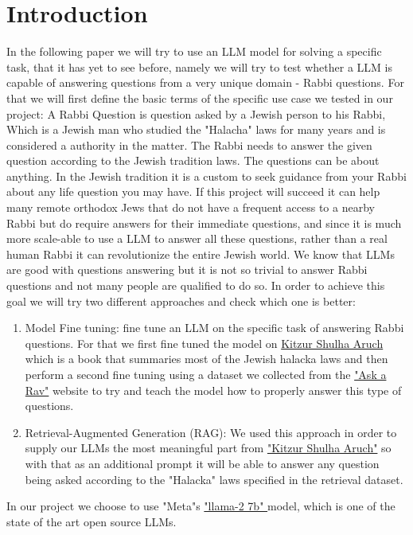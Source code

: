 \documentclass[11pt]{article}
\begin{document}
\section{Introduction}
In the following paper we will try to use an LLM model for solving a specific task, that it has yet to see before, namely we will try to test whether a LLM is capable of answering questions from a very unique domain - Rabbi questions. For that we will first define the basic terms of the specific use case we tested in our project:
A Rabbi Question is question asked by a Jewish person to his Rabbi, Which is a Jewish man who studied the "Halacha" laws for many years and is considered a authority in the matter. The Rabbi needs to answer the given question according to the Jewish tradition laws. The questions can be about anything. In the Jewish tradition it is a custom to seek guidance from your Rabbi about any life question you may have. If this project will succeed it can help many remote orthodox Jews  that do not have a frequent access to a nearby Rabbi but do require answers for their immediate questions, and since it is much more scale-able to use a LLM to answer all these questions, rather than a real human Rabbi it can revolutionize the entire Jewish world.  
We know that LLMs are good with questions answering but it is not so trivial to answer Rabbi questions and not many people are qualified to do so.
In order to achieve this goal we will try two different approaches and check which one is better:
\begin{enumerate}
    \item Model Fine tuning: fine tune an LLM on the specific task of answering Rabbi questions. For that we first fine tuned the model on  \href{https://www.sefaria.org.il/Kitzur_Shulchan_Arukh.1.7?lang=en}{ Kitzur Shulha Aruch} which is a book that summaries most of the Jewish halacka laws and then perform a second fine tuning using a dataset we collected from the \href{https://asktherav.com/ }{"Ask a Rav"} website to try and teach the model how to properly answer this type of questions.
    \item Retrieval-Augmented Generation (RAG): We used this approach in order to supply our LLMs the most meaningful part from  \href{https://www.sefaria.org.il/Kitzur_Shulchan_Arukh.1.7?lang=en}{ "Kitzur Shulha Aruch"} so with that as an additional prompt it will be able to answer any question being asked according to the "Halacka" laws specified in the retrieval dataset.
\end{enumerate}
In our project we choose to use "Meta"s \href{https://llama.meta.com/llama2/}{ "llama-2 7b" } model, which is one of the state of the art open source LLMs.
\end{document}
